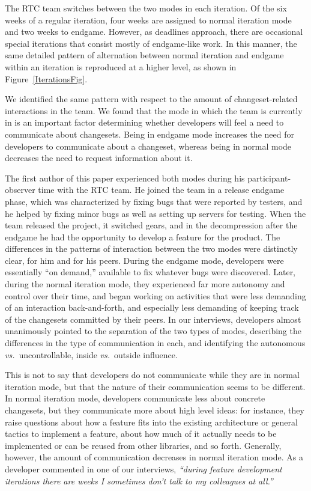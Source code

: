 \documentclass[12pt,oneside]{book}
\begin{document}
The RTC team switches between the two modes in each iteration. Of the six weeks of a regular iteration, four weeks are assigned to normal iteration mode and two weeks to endgame. However, as deadlines approach, there are occasional special iterations that consist mostly of endgame-like work. In this manner, the same detailed pattern of alternation between normal iteration and endgame within an iteration is reproduced at a higher level, as shown in Figure~\ref{IterationsFig}.

We identified the same pattern with respect to the amount of changeset-related interactions in the team. We found that the mode in which the team is currently in is an important factor determining whether developers will feel a need to communicate about changesets. Being in endgame mode increases the need for developers to communicate about a changeset, whereas being in normal mode decreases the need to request information about it.

The first author of this paper experienced both modes during his participant-observer time with the RTC team. He joined the team in a release endgame phase, which was characterized by fixing bugs that were reported by testers, and he helped by fixing minor bugs as well as setting up servers for testing. When the team released the project, it switched gears, and in the decompression after the endgame he had the opportunity to develop a feature for the product. The differences in the patterns of interaction between the two modes were distinctly clear, for him and for his peers. During the endgame mode, developers were essentially ``on demand,'' available to fix whatever bugs were discovered. Later, during the normal iteration mode, they experienced far more autonomy and control over their time, and began working on activities that were less demanding of an interaction back-and-forth, and especially less demanding of keeping track of the changesets committed by their peers. In our interviews, developers almost unanimously pointed to the separation of the two types of modes, describing the differences in the type of communication in each, and identifying the autonomous \emph{vs.}~uncontrollable, inside \emph{vs.}~outside influence.

This is not to say that developers do not communicate while they are in normal iteration  mode, but that the nature of their communication seems to be different. In normal iteration mode, developers communicate less about concrete changesets, but they communicate more about high level ideas: for instance, they raise questions about how a feature fits into the existing architecture or general tactics to implement a feature, about how much of it actually needs to be implemented or can be reused from other libraries, and so forth. Generally, however, the amount of communication decreases in normal iteration mode. As a developer commented in one of our interviews, \emph{``during feature development iterations there are weeks I sometimes don't talk to my colleagues at all.''} 
\end{document}
